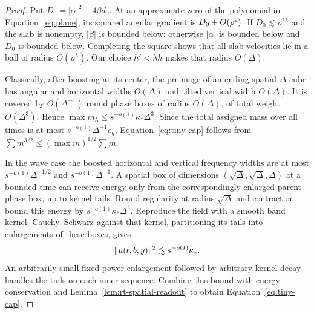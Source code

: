 \begin{proof}
Put $D_0=|\alpha|^2-4\beta d_0$.  At an approximate zero of the
polynomial in Equation~\eqref{eq:plane}, its squared angular gradient
is $D_0+O(\rho^\varepsilon)$.  If $D_0\lesssim\rho^{2\lambda}$ and
the slab is nonempty, $|\beta|$ is bounded below: otherwise
$|\alpha|$ is bounded below and $D_0$ is bounded below.  Completing
the square shows that all slab velocities lie in a ball of radius
$O(\rho^\lambda)$.  Our choice $h'<\lambda h$ makes that radius
$O(\Delta)$.

Classically, after boosting at its center, the preimage of an ending
spatial $\Delta$-cube has angular and horizontal widths
$O(\Delta)$ and tilted vertical width $O(\Delta)$.
It is covered by $O(\Delta^{-1})$ round phase boxes of radius
$O(\Delta)$, of total weight $O(\Delta^3)$.  Hence
$\max m_\lambda\le s^{-o(1)}\kappa_*\Delta^3$.
Since the total assigned mass over all times is at most
$s^{-o(1)}\Delta^{-1}e_g$, Equation~\eqref{eq:tiny-cap} follows
from $\sum m^{3/2}\le(\max m)^{1/2}\sum m$.

In the wave case the boosted horizontal and vertical frequency
widths are at most $s^{-o(1)}\Delta^{-1/2}$ and
$s^{-o(1)}\Delta^{-1}$.  A spatial box of dimensions
$(\sqrt\Delta,\sqrt\Delta,\Delta)$ at a bounded time can receive
energy only from the correspondingly enlarged parent phase box, up
to kernel tails.  Round regularity at radius $\sqrt\Delta$ and
contraction bound this energy by
$s^{-o(1)}\kappa_*\Delta^2$.  Reproduce the field with a smooth
band kernel.  Cauchy--Schwarz against that kernel, partitioning its
tails into enlargements of these boxes, gives
\[
 \lVert u(t,b,y)\rVert^2\lesssim s^{-o(1)}\kappa_*.
\]
An arbitrarily small fixed-power enlargement followed by arbitrary
kernel decay handles the tails on each inner sequence.  Combine this
bound with energy conservation and
Lemma~\ref{lem:rt-spatial-readout} to obtain
Equation~\eqref{eq:tiny-cap}.


\end{proof}
